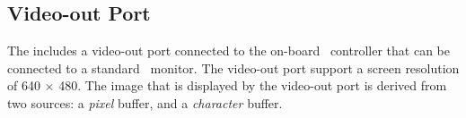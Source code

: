 \subsection{Video-out Port}
\label{sec:video_out}

The {\it \systemNameFull} includes a video-out port connected to the on-board
\videoOutDevice~controller that can be connected to a standard
\videoOutDevice~monitor. The video-out port support a screen resolution
of 640 $\times$ 480. The image that is displayed by the video-out port is
derived from two sources: a {\it pixel} buffer, and a {\it character} buffer.









